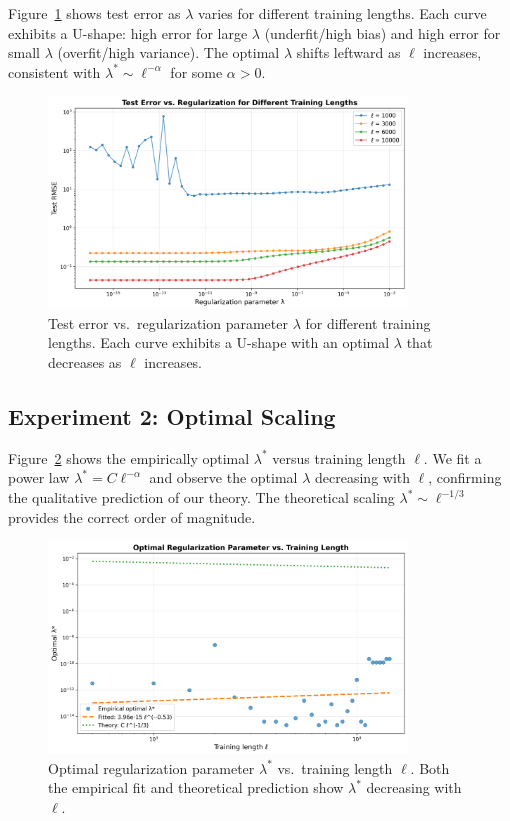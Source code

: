 \documentclass[11pt]{article}
\theoremstyle{definition}
\theoremstyle{remark}
\begin{document}
Figure~\ref{fig:exp1} shows test error as $\lambda$ varies for different training lengths. Each curve exhibits a U-shape: high error for large $\lambda$ (underfit/high bias) and high error for small $\lambda$ (overfit/high variance). The optimal $\lambda$ shifts leftward as $\ell$ increases, consistent with $\lambda^* \sim \ell^{-\alpha}$ for some $\alpha > 0$.

\begin{figure}[h]
\centering
\includegraphics[width=0.85\textwidth]{experiment1_lambda_vs_error.png}
\caption{Test error vs.\ regularization parameter $\lambda$ for different training lengths. Each curve exhibits a U-shape with an optimal $\lambda$ that decreases as $\ell$ increases.}
\label{fig:exp1}
\end{figure}

\subsection{Experiment 2: Optimal Scaling}

Figure~\ref{fig:exp2} shows the empirically optimal $\lambda^*$ versus training length $\ell$. We fit a power law $\lambda^* = C \ell^{-\alpha}$ and observe the optimal $\lambda$ decreasing with $\ell$, confirming the qualitative prediction of our theory. The theoretical scaling $\lambda^* \sim \ell^{-1/3}$ provides the correct order of magnitude.

\begin{figure}[h]
\centering
\includegraphics[width=0.85\textwidth]{experiment2_optimal_scaling.png}
\caption{Optimal regularization parameter $\lambda^*$ vs.\ training length $\ell$. Both the empirical fit and theoretical prediction show $\lambda^*$ decreasing with $\ell$.}
\label{fig:exp2}
\end{figure}
\end{document}
